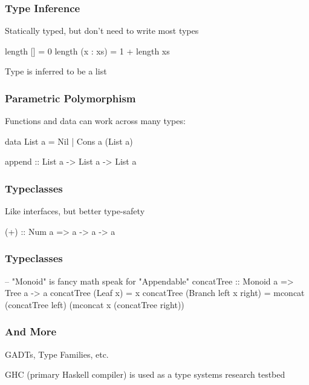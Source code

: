 \begin{frame}[fragile]
  \frametitle{Type Inference}

  Statically typed, but don't need to write most types

  \begin{semiverbatim}
length [] = 0
length (x : xs) = 1 + length xs
  \end{semiverbatim}

  Type is inferred to be a list
\end{frame}

\begin{frame}[fragile]
  \frametitle{Parametric Polymorphism}

  Functions and data can work across many types:

  \begin{semiverbatim}
data List a = Nil | Cons a (List a)

append :: List a -> List a -> List a
  \end{semiverbatim}
\end{frame}

\begin{frame}
  \frametitle{Typeclasses}

  Like interfaces, but better type-safety

  \begin{semiverbatim}
(+) :: Num a => a -> a -> a
  \end{semiverbatim}
\end{frame}

\begin{frame}[fragile]
  \frametitle{Typeclasses}
  \begin{semiverbatim}
-- "Monoid" is fancy math speak for "Appendable"
concatTree :: Monoid a => Tree a -> a
concatTree (Leaf x) = x
concatTree (Branch left x right) =
  mconcat (concatTree left)
          (mconcat x (concatTree right))
  \end{semiverbatim}
\end{frame}

\begin{frame}
  \frametitle{And More}

  GADTs, Type Families, etc.

  GHC (primary Haskell compiler) is used as a type systems research
  testbed
\end{frame}
  
